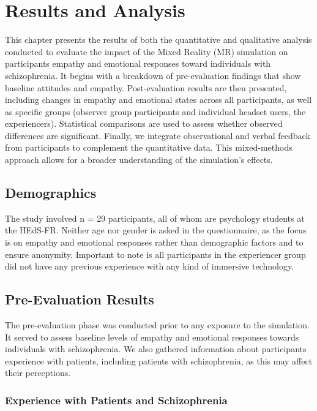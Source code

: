 \chapter{Results and Analysis}
\label{ch:resultsandanalysis}

This chapter presents the results of both the quantitative and qualitative analysis conducted to evaluate the impact of the Mixed Reality (MR) simulation on participants empathy and emotional responses toward individuals with schizophrenia. It begins with a breakdown of pre-evaluation findings that show baseline attitudes and empathy. Post-evaluation results are then presented, including changes in empathy and emotional states across all participants, as well as specific groups (observer group participants and individual headset users, the experiencers). Statistical comparisons are used to assess whether observed differences are significant. Finally, we integrate observational and verbal feedback from participants to complement the quantitative data. This mixed-methods approach allows for a broader understanding of the simulation's effects.

\section{Demographics}
The study involved n = 29 participants, all of whom are psychology students at the HEdS-FR. Neither age nor gender is asked in the questionnaire, as the focus is on empathy and emotional responses rather than demographic factors and to ensure anonymity. Important to note is all participants in the experiencer group did not have any previous experience with any kind of immersive technology.

\section{Pre-Evaluation Results}
The pre-evaluation phase was conducted prior to any exposure to the simulation. It served to assess baseline levels of empathy and emotional responses towards individuals with schizophrenia. We also gathered information about participants experience with patients, including patients with schizophrenia, as this may affect their perceptions.

\subsection{Experience with Patients and Schizophrenia}

